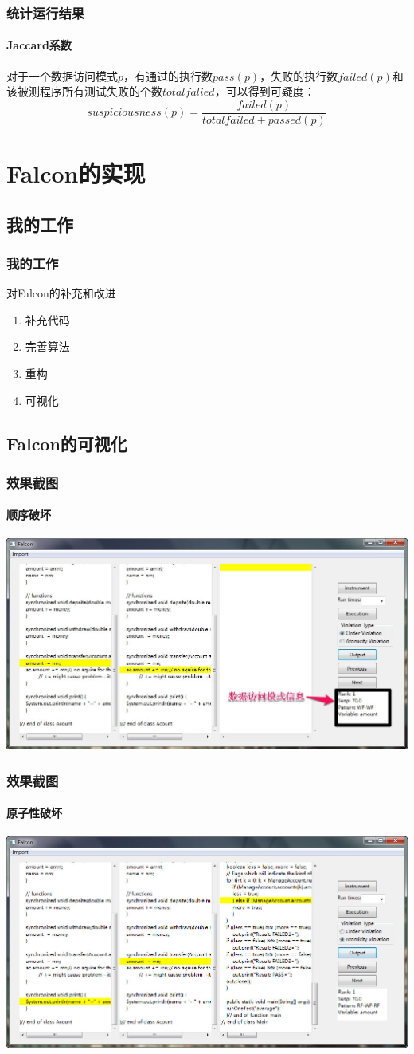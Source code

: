 ﻿\documentclass[12pt,serif,hyperref={CJKbookmarks=true}]{beamer}
\begin{document}
  \begin{frame}
    \frametitle{统计运行结果}
    \framesubtitle{Jaccard系数}
    对于一个数据访问模式$p$，有通过的执行数$pass(p)$，失败的执行数$failed(p)$和该被测程序所有测试失败的个数$totalfalied$，可以得到可疑度：
    \begin{equation*}
      suspiciousness(p)=\frac{failed(p)}{totalfailed + passed(p)}
    \end{equation*}
  \end{frame}

  \section{Falcon的实现}
  \subsection{我的工作}
  \begin{frame}
    \frametitle{我的工作}
    \begin{beamerboxesrounded}[upper=up,lower=low,shadow=true]{对Falcon的补充和改进}
      \begin{enumerate}
         \item 补充代码
         \pause
         \item 完善算法
         \pause
         \item 重构
         \pause
         \item 可视化
      \end{enumerate}
    \end{beamerboxesrounded}
  \end{frame}

  \subsection{Falcon的可视化}
  \begin{frame}
    \frametitle{效果截图}
    \framesubtitle{顺序破坏}
    \centering
    \includegraphics[width=.8\textwidth]{order.jpg}
  \end{frame}

  \begin{frame}
    \frametitle{效果截图}
    \framesubtitle{原子性破坏}
    \centering
    \includegraphics[width=.8\textwidth]{atom.jpg}
  \end{frame}
\end{document}
